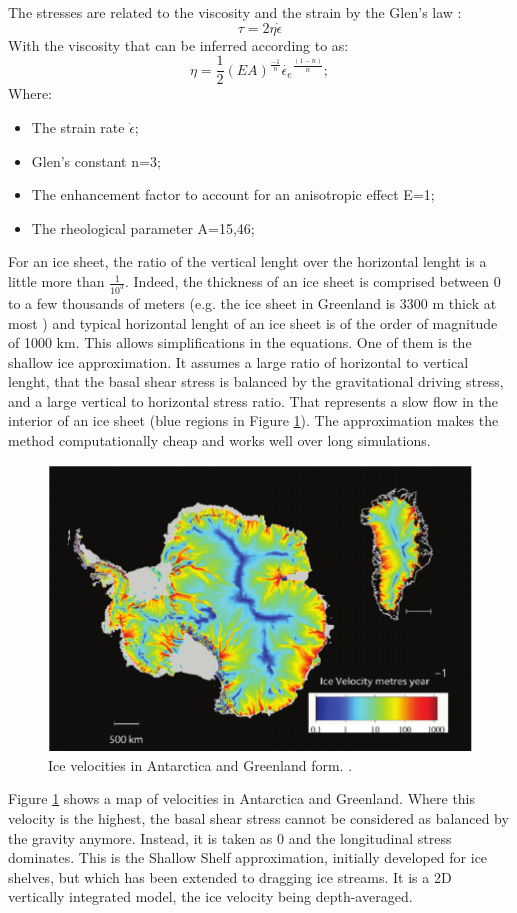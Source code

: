 \documentclass[a4paper,12pt]{article}
\begin{document}
The stresses are related to the viscosity and the strain by the Glen's law \cite[]{glen1958flow}:
\begin{equation}
	\tau = 2\eta\dot{\epsilon}
\end{equation}
With the viscosity that can be inferred according to \cite{gagliardini2013capabilities} as:
\begin{equation}
	\eta = \frac{1}{2}(EA)^\frac{-1}{n} \dot{\epsilon_e}^\frac{(1-n)}{n};
\end{equation}
Where:
\begin{itemize}
	\item The strain rate $\dot{\epsilon}$;
	\item Glen's constant n=3;
	\item The enhancement factor to account for an anisotropic effect E=1;
	\item The rheological parameter A=15,46;
\end{itemize}
For an ice sheet, the ratio of the vertical lenght over the horizontal lenght is a little more than $\frac{1}{10^3}$. Indeed, the thickness of an ice sheet is comprised between 0 to a few thousands of meters (e.g. the ice sheet in Greenland is 3300 m thick at most \cite[]{bamber2001new}) and typical horizontal lenght of an ice sheet is of the order of magnitude of 1000 km. This allows simplifications in the equations. One of them is the shallow ice approximation. It assumes a large ratio of horizontal to vertical lenght, that the basal shear stress is balanced by  the gravitational driving stress, and a large vertical to horizontal stress ratio. That represents a slow flow in the interior of an ice sheet (blue regions in Figure \ref{velocityglaciar}). The approximation makes the method computationally cheap and works well over long simulations.

\begin{figure}[!h]
	\centering
	\includegraphics[width=0.7\linewidth]{../fig/velocityglaciar}
	\caption{Ice velocities in Antarctica and Greenland form. \cite[]{allison2009ice}.}
	\label{velocityglaciar}
\end{figure}
Figure \ref{velocityglaciar} shows a map of velocities in Antarctica and Greenland. Where this velocity is the highest, the basal shear stress cannot be considered as balanced by the gravity anymore. Instead, it is taken as 0 and the longitudinal stress dominates. This is the Shallow Shelf approximation, initially developed for ice shelves, but which has been extended to dragging ice streams. It is a 2D vertically integrated model, the ice velocity being depth-averaged.
\end{document}
